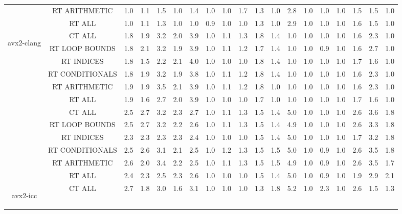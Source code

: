 \begin{adjustbox}{center}
\begin{tabular}{|c|c|c|c|c|c|c|c|c|c|c|c|c|c|c|c|c|c|c|}
 & RT ARITHMETIC & 1.0 & 1.1 & 1.5 & 1.0 & 1.4 & 1.0 & 1.0 & 1.7 & 1.3 & 1.0 & 2.8 & 1.0 & 1.0 & 1.0 & 1.5 & 1.5 & 1.0 \\ 
 & RT ALL & 1.0 & 1.1 & 1.3 & 1.0 & 1.0 & 0.9 & 1.0 & 1.0 & 1.3 & 1.0 & 2.9 & 1.0 & 1.0 & 1.0 & 1.6 & 1.5 & 1.0 \\ 
\hline 
  \multirow{7}{*}{\begin{turn}{90}avx2-clang\end{turn}} & CT ALL &1.8 & 1.9 & 3.2 & 2.0 & 3.9 & 1.0 & 1.1 & 1.3 & 1.8 & 1.4 & 1.0 & 1.0 & 1.0 & 1.0 & 1.6 & 2.3 & 1.0 \\ 
 & RT LOOP BOUNDS & 1.8 & 2.1 & 3.2 & 1.9 & 3.9 & 1.0 & 1.1 & 1.2 & 1.7 & 1.4 & 1.0 & 1.0 & 0.9 & 1.0 & 1.6 & 2.7 & 1.0 \\ 
 & RT INDICES & 1.8 & 1.5 & 2.2 & 2.1 & 4.0 & 1.0 & 1.0 & 1.0 & 1.8 & 1.4 & 1.0 & 1.0 & 1.0 & 1.0 & 1.7 & 1.6 & 1.0 \\ 
 & RT CONDITIONALS & 1.8 & 1.9 & 3.2 & 1.9 & 3.8 & 1.0 & 1.1 & 1.2 & 1.8 & 1.4 & 1.0 & 1.0 & 1.0 & 1.0 & 1.6 & 2.3 & 1.0 \\ 
 & RT ARITHMETIC & 1.9 & 1.9 & 3.5 & 2.1 & 3.9 & 1.0 & 1.1 & 1.2 & 1.8 & 1.0 & 1.0 & 1.0 & 1.0 & 1.0 & 1.6 & 2.3 & 1.0 \\ 
 & RT ALL & 1.9 & 1.6 & 2.7 & 2.0 & 3.9 & 1.0 & 1.0 & 1.0 & 1.7 & 1.0 & 1.0 & 1.0 & 1.0 & 1.0 & 1.7 & 1.6 & 1.0 \\ 
\hline 
  \multirow{7}{*}{\begin{turn}{90}avx2-gcc\end{turn}} & CT ALL &2.5 & 2.7 & 3.2 & 2.3 & 2.7 & 1.0 & 1.1 & 1.3 & 1.5 & 1.4 & 5.0 & 1.0 & 1.0 & 1.0 & 2.6 & 3.6 & 1.8 \\ 
 & RT LOOP BOUNDS & 2.5 & 2.7 & 3.2 & 2.2 & 2.6 & 1.0 & 1.1 & 1.3 & 1.5 & 1.4 & 4.9 & 1.0 & 1.0 & 1.0 & 2.6 & 3.3 & 1.8 \\ 
 & RT INDICES & 2.3 & 2.3 & 2.3 & 2.3 & 2.4 & 1.0 & 1.0 & 1.0 & 1.5 & 1.4 & 5.0 & 1.0 & 1.0 & 1.0 & 1.7 & 3.2 & 1.8 \\ 
 & RT CONDITIONALS & 2.5 & 2.6 & 3.1 & 2.1 & 2.5 & 1.0 & 1.2 & 1.3 & 1.5 & 1.5 & 5.0 & 1.0 & 0.9 & 1.0 & 2.6 & 3.5 & 1.8 \\ 
 & RT ARITHMETIC & 2.6 & 2.0 & 3.4 & 2.2 & 2.5 & 1.0 & 1.1 & 1.3 & 1.5 & 1.5 & 4.9 & 1.0 & 0.9 & 1.0 & 2.6 & 3.5 & 1.7 \\ 
 & RT ALL & 2.4 & 2.3 & 2.5 & 2.3 & 2.6 & 1.0 & 1.0 & 1.0 & 1.5 & 1.4 & 5.0 & 1.0 & 0.9 & 1.0 & 1.9 & 2.9 & 2.1 \\ 
\hline 
  \multirow{7}{*}{\begin{turn}{90}avx2-icc\end{turn}} & CT ALL &2.7 & 1.8 & 3.0 & 1.6 & 3.1 & 1.0 & 1.0 & 1.0 & 1.3 & 1.8 & 5.2 & 1.0 & 2.3 & 1.0 & 2.6 & 1.5 & 1.3 \\ 

\end{tabular}
\end{adjustbox}
